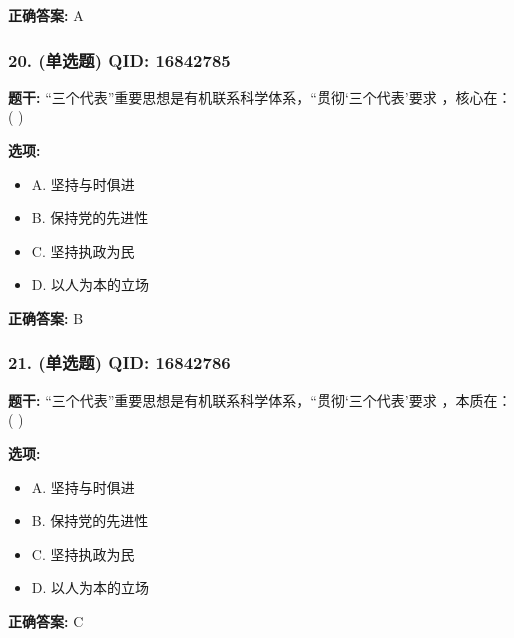 \documentclass[12pt,UTF8]{ctexart}
\begin{document}
\textbf{正确答案:}
A

\vspace{0.3em}\hrulefill\vspace{0.7em}

\subsubsection*{20. (单选题) \small QID: 16842785}

\textbf{题干:}
“三个代表”重要思想是有机联系科学体系，“贯彻‘三个代表’要求 ，核心在： ( )

\textbf{选项:}
\begin{itemize}[leftmargin=*]

  \item A. 坚持与时俱进

  \item B. 保持党的先进性

  \item C. 坚持执政为民

  \item D. 以人为本的立场

\end{itemize}

\textbf{正确答案:}
B

\vspace{0.3em}\hrulefill\vspace{0.7em}

\subsubsection*{21. (单选题) \small QID: 16842786}

\textbf{题干:}
“三个代表”重要思想是有机联系科学体系，“贯彻‘三个代表’要求 ，本质在： ( )

\textbf{选项:}
\begin{itemize}[leftmargin=*]

  \item A. 坚持与时俱进

  \item B. 保持党的先进性

  \item C. 坚持执政为民

  \item D. 以人为本的立场

\end{itemize}

\textbf{正确答案:}
C

\vspace{0.3em}\hrulefill\vspace{0.7em}
\end{document}
